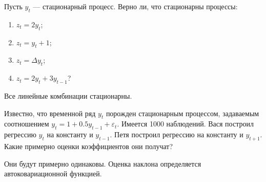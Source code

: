 \begin{problem}
Пусть $y_{t}$ — стационарный процесс. Верно ли, что стационарны процессы:
\begin{enumerate}
\item $z_{t}=2y_{t}$;
\item $z_{t}=y_{t}+1$;
\item $z_{t}=\Delta y_{t}$;
\item $z_{t}=2y_{t}+3y_{t-1}$?
\end{enumerate}


\begin{sol}
Все линейные комбинации стационарны.
\end{sol}
\end{problem}






\begin{problem}
Известно, что временной ряд $y_{t}$ порожден стационарным процессом, задаваемым соотношением $y_{t}=1+0.5y_{t-1}+\varepsilon_{t}$. Имеется 1000 наблюдений. Вася построил регрессию $y_{t}$ на константу и $y_{t-1}$. Петя построил регрессию на константу и $y_{t+1}$. Какие примерно оценки коэффициентов они получат?


\begin{sol}
Они будут примерно одинаковы. Оценка наклона определяется автоковариационной функцией.
\end{sol}
\end{problem}





